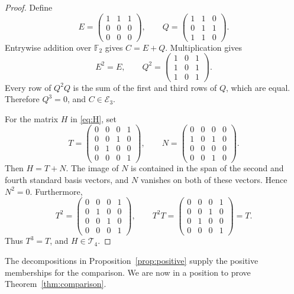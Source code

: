 \documentclass[12pt]{amsart}
\theoremstyle{remark}
\numberwithin{equation}{section}
\theoremstyle{definition}
\newcommand{\F}{\mathbb F}
\newcommand{\TS}{\mathcal T}
\newcommand{\IC}{\mathcal E}
\begin{document}
\begin{proof}
Define
\[
 E=\begin{pmatrix}
 1&1&1\\
 0&0&0\\
 0&0&0
 \end{pmatrix},\qquad
 Q=\begin{pmatrix}
 1&1&0\\
 0&1&1\\
 1&1&0
 \end{pmatrix}.
\]
Entrywise addition over $\F_2$ gives $C=E+Q$. Multiplication gives
\[
 E^2=E,\qquad
 Q^2=\begin{pmatrix}
 1&0&1\\
 1&0&1\\
 1&0&1
 \end{pmatrix}.
\]
Every row of $Q^2Q$ is the sum of the first and third rows of $Q$, which are equal. Therefore $Q^3=0$, and $C\in\IC_3$.

For the matrix $H$ in \eqref{eq:H}, set
\[
 T=\begin{pmatrix}
 0&0&0&1\\
 0&0&1&0\\
 0&1&0&0\\
 0&0&0&1
 \end{pmatrix},\qquad
 N=\begin{pmatrix}
 0&0&0&0\\
 1&0&1&0\\
 0&0&0&0\\
 0&0&1&0
 \end{pmatrix}.
\]
Then $H=T+N$. The image of $N$ is contained in the span of the second and fourth standard basis vectors, and $N$ vanishes on both of these vectors. Hence $N^2=0$. Furthermore,
\[
 T^2=\begin{pmatrix}
 0&0&0&1\\
 0&1&0&0\\
 0&0&1&0\\
 0&0&0&1
 \end{pmatrix},\qquad
 T^2T=\begin{pmatrix}
 0&0&0&1\\
 0&0&1&0\\
 0&1&0&0\\
 0&0&0&1
 \end{pmatrix}=T.
\]
Thus $T^3=T$, and $H\in\TS_4$.
\end{proof}

The decompositions in Proposition~\ref{prop:positive} supply the positive memberships for the comparison. We are now in a position to prove Theorem~\ref{thm:comparison}.
\end{document}

